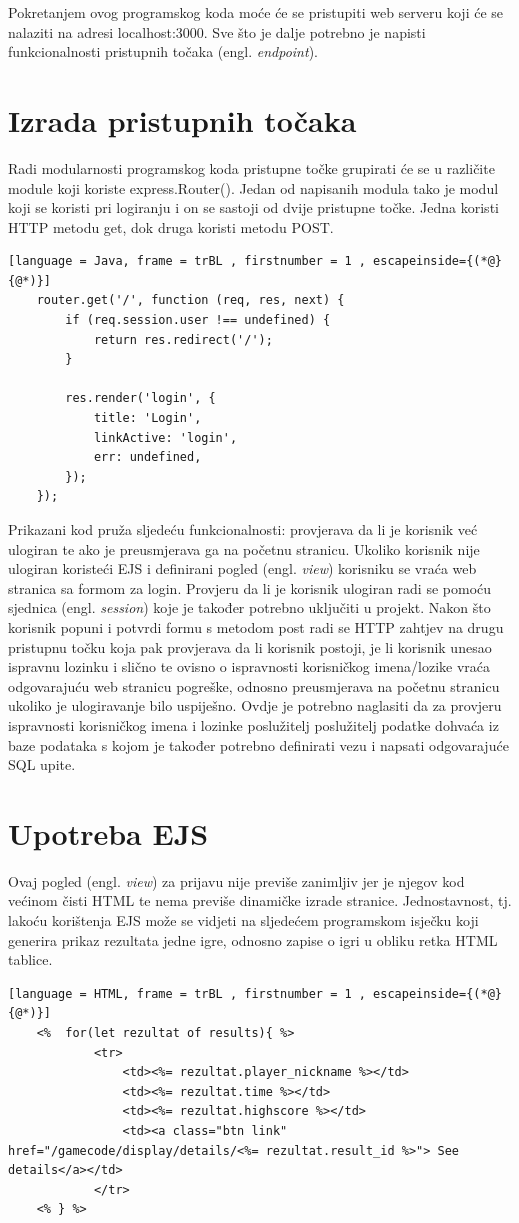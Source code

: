 \documentclass[times, utf8, zavrsni]{fer}
\begin{document}
	Pokretanjem ovog programskog koda moće će se pristupiti web serveru koji će se nalaziti na adresi localhost:3000. Sve što je dalje potrebno je napisti funkcionalnosti pristupnih točaka (engl. \textit{endpoint}).

	\section{Izrada pristupnih točaka}
	Radi modularnosti programskog koda  pristupne točke grupirati će se u različite module koji koriste express.Router(). Jedan od napisanih modula tako je modul koji se koristi pri logiranju i on se sastoji od dvije pristupne točke. Jedna koristi HTTP metodu get, dok druga koristi metodu POST.
	\begin{lstlisting}[language = Java, frame = trBL , firstnumber = 1 , escapeinside={(*@}{@*)}]
	router.get('/', function (req, res, next) {
		if (req.session.user !== undefined) {
			return res.redirect('/');
		}

		res.render('login', {
			title: 'Login',
			linkActive: 'login',
			err: undefined,
		});
	});
	\end{lstlisting}
	
	Prikazani kod pruža sljedeću funkcionalnosti: provjerava da li je korisnik već ulogiran te ako je preusmjerava ga na početnu stranicu. Ukoliko korisnik nije ulogiran koristeći EJS i definirani pogled (engl. \textit{view}) korisniku se vraća
	web stranica sa formom za login. Provjeru da li je korisnik ulogiran radi se pomoću sjednica (engl. \textit{session}) koje je također potrebno uključiti u projekt. Nakon što korisnik popuni i potvrdi formu s metodom post radi se HTTP zahtjev 
	na drugu pristupnu točku koja pak provjerava da li korisnik postoji, je li korisnik unesao ispravnu lozinku i slično te ovisno o ispravnosti korisničkog imena/lozike vraća odgovarajuću web stranicu pogreške, odnosno preusmjerava na početnu stranicu
	ukoliko je ulogiravanje bilo uspiješno. Ovdje je potrebno naglasiti da za provjeru ispravnosti korisničkog imena i lozinke poslužitelj poslužitelj podatke dohvaća iz baze podataka s kojom je također potrebno definirati vezu i napsati odgovarajuće SQL
	upite. 
	

	\section{Upotreba EJS}
	Ovaj pogled (engl. \textit{view}) za prijavu nije previše zanimljiv jer je njegov kod većinom čisti HTML te nema previše dinamičke izrade stranice. Jednostavnost, tj. lakoću korištenja EJS može se vidjeti na sljedećem programskom isječku koji 
	generira prikaz rezultata jedne igre, odnosno zapise o igri u obliku retka HTML tablice. 
	\begin{lstlisting}[language = HTML, frame = trBL , firstnumber = 1 , escapeinside={(*@}{@*)}]
	<% 	for(let rezultat of results){ %>
			<tr>
				<td><%= rezultat.player_nickname %></td>
				<td><%= rezultat.time %></td>
				<td><%= rezultat.highscore %></td>
				<td><a class="btn link" href="/gamecode/display/details/<%= rezultat.result_id %>"> See details</a></td>
            </tr>
	<% } %>
	\end{lstlisting}
	
\end{document}
